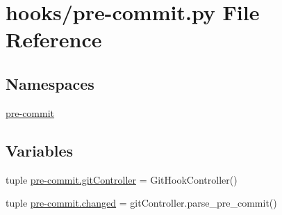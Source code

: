 \section{hooks/pre-\/commit.py File Reference}
\label{pre-commit_8py}
\subsection*{Namespaces}
\begin{DoxyCompactItemize}
\item 
\hyperlink{namespacepre-commit}{pre-\/commit}
\end{DoxyCompactItemize}
\subsection*{Variables}
\begin{DoxyCompactItemize}
\item 
tuple \hyperlink{namespacepre-commit_a95f05a041aa51857ded4a498e766b83d}{pre-\/commit.\-git\-Controller} = Git\-Hook\-Controller()
\item 
tuple \hyperlink{namespacepre-commit_a1c824fbe54d00a54423cb4955f97dcf5}{pre-\/commit.\-changed} = git\-Controller.\-parse\-\_\-pre\-\_\-commit()
\end{DoxyCompactItemize}
